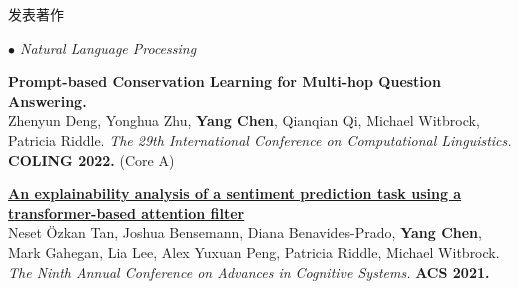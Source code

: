 \documentclass{resume} %
\begin{document}
\begin{rSection}{发表著作}
\begin{rSubsection}{\large\em $\bullet$ Natural Language Processing}{}{}{}
	\item {\bf Prompt-based Conservation  Learning for Multi-hop Question Answering.}\\
Zhenyun Deng, Yonghua Zhu, \textbf{Yang Chen}, Qianqian Qi, Michael Witbrock, Patricia Riddle. {\em The 29th International Conference on Computational Linguistics.} \textbf{COLING 2022.} (Core A)\\
\item {\href{https://advancesincognitivesystems.github.io/acs2021/data/ACS-21_paper_22.pdf}{\bf An explainability analysis of a sentiment prediction task using a transformer-based attention filter}}\\
		Neset \"{O}zkan Tan, Joshua Bensemann, Diana Benavides-Prado, \textbf{Yang Chen}, Mark Gahegan, Lia Lee, Alex Yuxuan Peng, Patricia Riddle, Michael Witbrock. {\em The Ninth Annual Conference on Advances in Cognitive Systems.} \textbf{ACS 2021.}\\
\end{rSubsection}



\end{rSection}
\end{document}
